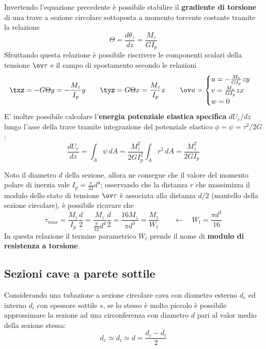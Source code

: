     	\begin{concetto}
    		Invertendo l'equazione precedente è possibile stabilire il \textbf{gradiente di torsione} di una trave a sezione circolare sottoposta a momento torcente costante tramite la relazione
    		\begin{equation}
    			\Theta = \frac{d\theta_z}{dz}= \frac{M_z}{G I_p}
    		\end{equation}
    		Sfruttando questa relazione è possibile riscrivere le componenti scalari della tensione $\ov \tau$ e il campo di spostamento secondo le relazioni
    		\begin{equation}
    			\txz = -G\Theta y = - \frac{M_z}{I_p}y \qquad \tyz = G\Theta x = \frac{M_z}{I_p}x \qquad
    			\ov u = \begin{cases}
    				u =- \frac{M_z}{GI_p} z y \\ v =\frac{M_z}{GI_p} z x \\ w =0
    			\end{cases}
    		\end{equation}
    		E' inoltre possibile calcolare l'\textbf{energia potenziale elastica specifica} $dU_e /dz$ lungo l'asse della trave tramite integrazione del potenziale elastico $\phi = \psi = \tau^2/2G$:
    		\begin{equation}
    			\frac{dU_e}{dz} = \int_A\psi \, dA = \frac{M_z^2}{2GI_p^2} \int_Ar^2\, dA  = \frac{M_z^2}{2GI_p}
    		\end{equation}
    	\end{concetto}
    	\begin{concetto}
    		Noto il diametro $d$ della sezione, allora ne consegue che il valore del momento polare di inerzia vale $I_p = \frac \pi {32}d^4$; osservando che la distanza $r$ che massimizza il modulo dello stato di tensione $\ov \tau$ è associata alla distanza $d/2$ (mantello della sezione circolare), è possibile ricavare che
    		\begin{equation} \label{eq:sv:modulotorsione}
    			\tau_{max} = \frac{M_z}{I_p} \frac d 2 = \frac{M_z}{\frac{\pi}{32}d^4} \frac d 2 =\frac{16 M_z}{\pi d^3} = \frac{M_z}{W_t}  \qquad \leftarrow \quad W_t = \frac{\pi d^3}{16}
    		\end{equation}
    		In questa relazione il termine parametrico $W_t$ prende il nome di \textbf{modulo di resistenza a torsione}.
    	\end{concetto}
    	
    \subsection{Sezioni cave a parete sottile} \label{sec:torst:paretesottile}
    	Considerando una tubazione a sezione circolare cava con diametro esterno $d_e$ ed interno $d_i$ con spessore sottile $s$, se lo stesso è molto piccolo è possibile approssimare la sezione ad una circonferenza con diametro $d$ pari al valor medio della sezione stessa:
    	\[ d_e \simeq d_i \simeq d = \frac{d_e - d_i}{2}\]
    	
